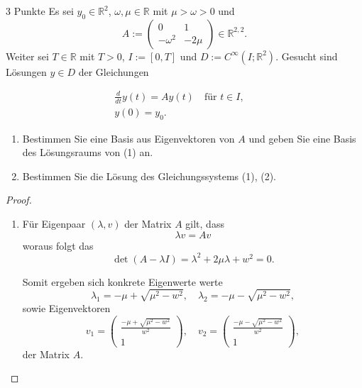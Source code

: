 \documentclass{problemset}
\begin{document}
\begin{problem}{3 Punkte}
Es sei $y_0 \in \mathbb{R}^2$, $\omega, \mu \in \mathbb{R}$ mit $\mu > \omega >
    0$ und
\[ A := \begin{pmatrix} 0 & 1 \\ -\omega^2 & -2\mu \end{pmatrix} \in \mathbb{R}^{2,2}. \]
Weiter sei $T \in \mathbb{R}$ mit $T > 0$, $I := [0, T]$ und $D :=
    C^\infty(I; \mathbb{R}^2)$. Gesucht sind Lösungen $y \in D$ der Gleichungen

\begin{align}
    \frac{d}{dt} y(t) = Ay(t) \quad \text{für } t \in I, \quad \\
    y(0) = y_0. \quad
\end{align}

\begin{enumerate}
    \item Bestimmen Sie eine Basis aus Eigenvektoren von $A$ und geben Sie eine
          Basis des Lösungsraums von (1) an.
    \item Bestimmen Sie die Lösung des Gleichungssystems (1), (2).
\end{enumerate}

\begin{proof}
    \leavevmode

    \begin{enumerate}
        \item Für Eigenpaar \((\lambda, v)\) der Matrix \(A\) gilt, dass
              \begin{equation*}
                  \lambda v = Av
              \end{equation*} woraus folgt das
              \begin{equation*}
                  \det(A - \lambda I) = \lambda^2 + 2\mu\lambda + w^2 = 0.
              \end{equation*}

              Somit ergeben sich konkrete Eigenwerte werte
              \begin{equation*}
                  \lambda_1 =  -\mu + \sqrt{\mu^2 - w^2}, \quad \lambda_2 =  -\mu - \sqrt{\mu^2 - w^2},
              \end{equation*} sowie Eigenvektoren
              \begin{equation*}
                  v_1 = \begin{pmatrix}
                      \frac{-\mu + \sqrt{\mu^2 - w^2}}{w^2} \\ 1
                  \end{pmatrix}, \quad
                  v_2 = \begin{pmatrix}
                      \frac{-\mu - \sqrt{\mu^2 - w^2}}{w^2} \\ 1
                  \end{pmatrix},
              \end{equation*} der Matrix \(A\).


\end{enumerate}
\end{proof}
\end{problem}
\end{document}
